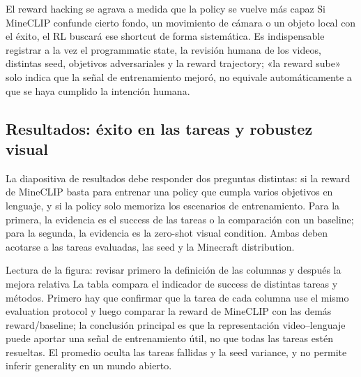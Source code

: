 \begin{warningbox}{El reward hacking se agrava a medida que la policy se vuelve más capaz}
Si MineCLIP confunde cierto fondo, un movimiento de cámara o un objeto local con el éxito, el RL buscará ese shortcut de forma sistemática. Es indispensable registrar a la vez el programmatic state, la revisión humana de los videos, distintas seed, objetivos adversariales y la reward trajectory; «la reward sube» solo indica que la señal de entrenamiento mejoró, no equivale automáticamente a que se haya cumplido la intención humana.
\end{warningbox}


\subsection{Resultados: éxito en las tareas y robustez visual}

La diapositiva de resultados debe responder dos preguntas distintas: si la reward de MineCLIP basta para entrenar una policy que cumpla varios objetivos en lenguaje, y si la policy solo memoriza los escenarios de entrenamiento. Para la primera, la evidencia es el success de las tareas o la comparación con un baseline; para la segunda, la evidencia es la zero-shot visual condition. Ambas deben acotarse a las tareas evaluadas, las seed y la Minecraft distribution.


\begin{knowledgebox}{Lectura de la figura: revisar primero la definición de las columnas y después la mejora relativa}
La tabla compara el indicador de success de distintas tareas y métodos. Primero hay que confirmar que la tarea de cada columna use el mismo evaluation protocol y luego comparar la reward de MineCLIP con las demás reward/baseline; la conclusión principal es que la representación video--lenguaje puede aportar una señal de entrenamiento útil, no que todas las tareas estén resueltas. El promedio oculta las tareas fallidas y la seed variance, y no permite inferir generality en un mundo abierto.
\end{knowledgebox}

